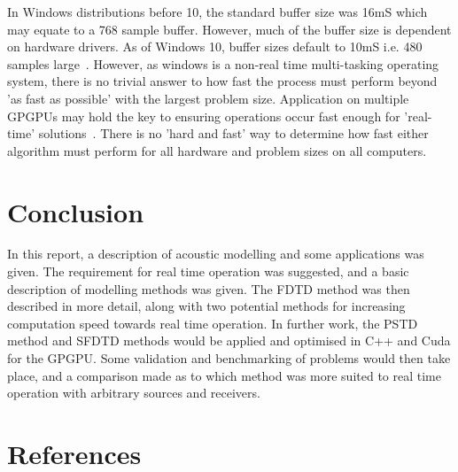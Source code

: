 \documentclass{svproc}
\begin{document}
In Windows distributions before 10, the standard buffer size was 16mS which may equate to a 768 sample buffer. However, much of the buffer size is dependent on hardware drivers. As of Windows 10, buffer sizes default to 10mS i.e. 480 samples large~\cite{Microsoft2016}. However, as windows is a non-real time multi-tasking operating system, there is no trivial answer to how fast the process must perform beyond 'as fast as possible' with the largest problem size. Application on multiple GPGPUs may hold the key to ensuring operations occur fast enough for 'real-time' solutions~\cite{Savioja2010}. There is no 'hard and fast' way to determine how fast either algorithm must perform for all hardware and problem sizes on all computers.

\section{Conclusion}
In this report, a description of acoustic modelling and some applications was given. The requirement for real time operation was suggested, and a basic description of modelling methods was given. The FDTD method was then described in more detail, along with two potential methods for increasing computation speed towards real time operation. In further work, the PSTD method and SFDTD methods would be applied and optimised in C++ and Cuda for the GPGPU. Some validation and benchmarking of problems would then take place, and a comparison made as to which method was more suited to real time operation with arbitrary sources and receivers.


\section{References}


\end{document}

